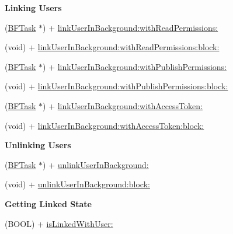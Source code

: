 \begin{Indent}{\bf Linking Users}\par
{\em 

 

 }\begin{DoxyCompactItemize}
\item 
(\hyperlink{interface_b_f_task}{B\+F\+Task} $\ast$) + \hyperlink{interface_p_f_facebook_utils_a24bcc40f6fc1036e72cf05db71357a04}{link\+User\+In\+Background\+:with\+Read\+Permissions\+:}
\item 
(void) + \hyperlink{interface_p_f_facebook_utils_a4a8dbfa80bf8092585be5ebc7dfbc95e}{link\+User\+In\+Background\+:with\+Read\+Permissions\+:block\+:}
\item 
(\hyperlink{interface_b_f_task}{B\+F\+Task} $\ast$) + \hyperlink{interface_p_f_facebook_utils_ace8592dedd3af479304850492ba2d3f0}{link\+User\+In\+Background\+:with\+Publish\+Permissions\+:}
\item 
(void) + \hyperlink{interface_p_f_facebook_utils_a870e42c332ece2180955633c6d558722}{link\+User\+In\+Background\+:with\+Publish\+Permissions\+:block\+:}
\item 
(\hyperlink{interface_b_f_task}{B\+F\+Task} $\ast$) + \hyperlink{interface_p_f_facebook_utils_a755587d4e05f79e5a44b4e0bad7ec64c}{link\+User\+In\+Background\+:with\+Access\+Token\+:}
\item 
(void) + \hyperlink{interface_p_f_facebook_utils_ac7178d97f7d80e00c42809ca7f2fa719}{link\+User\+In\+Background\+:with\+Access\+Token\+:block\+:}
\end{DoxyCompactItemize}
\end{Indent}
\begin{Indent}{\bf Unlinking Users}\par
{\em 

 

 }\begin{DoxyCompactItemize}
\item 
(\hyperlink{interface_b_f_task}{B\+F\+Task} $\ast$) + \hyperlink{interface_p_f_facebook_utils_a0fa5b2f0bae045b05cefd4636935a61f}{unlink\+User\+In\+Background\+:}
\item 
(void) + \hyperlink{interface_p_f_facebook_utils_aca714aba621d4257861deab47d1dabc9}{unlink\+User\+In\+Background\+:block\+:}
\end{DoxyCompactItemize}
\end{Indent}
\begin{Indent}{\bf Getting Linked State}\par
{\em 

 

 }\begin{DoxyCompactItemize}
\item 
(B\+O\+O\+L) + \hyperlink{interface_p_f_facebook_utils_ac97fda6c82c6682d992e21baf6f710ac}{is\+Linked\+With\+User\+:}
\end{DoxyCompactItemize}
\end{Indent}


